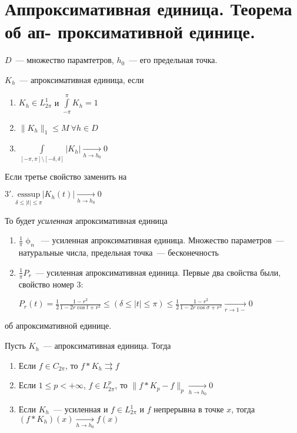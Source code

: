 \section{Аппроксимативная единица. Теорема об ап-
проксимативной единице.}

\begin{definition}
    $D$~--- множество парамтетров, $h_0$~--- его предельная точка.
    
    $K_h$~--- апроксимативная единица, если
    \begin{enumerate}
        \item $K_h \in L_{2\pi}^1$ и $\int\limits_{-\pi}^{\pi}K_h = 1$
        \item $\|K_h\|_1 \leq M\ \forall h \in D$
        \item $\int\limits_{[-\pi, \pi] \setminus [-\delta, \delta]} |K_h| \xrightarrow[h \to h_0]{} 0$
    \end{enumerate}
    Если третье свойство заменить на
    
    $3'.\ \underset{\delta \leq |t| \leq \pi}{\mathrm{esssup}} |K_h(t)| \xrightarrow[h \to h_0]{} 0$
    
    То будет \textit{усиленная} апроксимативная единица
\end{definition}

\begin{examples}
    \leavevmode
    \begin{enumerate}
        \item $\frac{1}{\pi}\upphi_n$~--- усиленная апроксимативная единица. Множество параметров~--- натуральные числа, предельная точка~--- бесконечность
        \item $\frac{1}{\pi}P_r$~--- усиленная апроксимативная единица. Первые два свойства были, свойство номер 3:
        
              $P_r(t) = \frac{1}{2} \frac{1 - r^2}{1 - 2r\cos t + r^2} \leq (\delta \leq |t| \leq \pi) \leq \frac{1}{2} \frac{1 - r^2}{1 - 2r\cos\sigma + r^2} \xrightarrow[r \to 1-]{} 0 $
    \end{enumerate}
\end{examples}

\begin{theorem}
    об апроксимативной единице.
    
    Пусть $K_h$~--- апроксимативная единица. Тогда
    \begin{enumerate}
        \item Если $f \in C_{2\pi}$, то $f \ast K_h \rightrightarrows f$
        \item Если $1 \leq p < +\infty$, $f \in L_{2\pi}^p$, то $\|f\ast K_p - f\|_p \xrightarrow[h \to h_0]{} 0$
        \item Если $K_h$~--- усиленная и $f \in L_{2\pi}^1$ и $f$ непрерывна в точке $x$, тогда $(f \ast K_h)(x) \xrightarrow[h \to h_0]{} f(x)$
    \end{enumerate}
\end{theorem}

